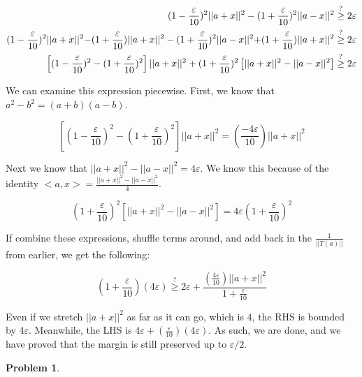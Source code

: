\documentclass[11pt]{article}
\theoremstyle{definition}
\theoremstyle{case}
\theoremstyle{theorem}
\newtheorem{prob}{Problem}
\begin{document}
\begin{enumerate}[label=(\alph*)]
\begin{align*}
  (1-\frac{\varepsilon}{10})^2||a+x||^2 - (1 + \frac{\varepsilon}{10})^2||a-x||^2 &\stackrel{?}{\geq} 2\varepsilon \\
  (1-\frac{\varepsilon}{10})^2||a+x||^2 \textbf{$ - (1 + \frac{\varepsilon}{10})||a+x||^2$} - (1 + \frac{\varepsilon}{10})^2||a-x||^2 \textbf{$ + (1 + \frac{\varepsilon}{10})||a+x||^2$} &\stackrel{?}{\geq} 2\varepsilon \\
  \left[ (1 - \frac{\varepsilon}{10})^2 - (1 + \frac{\varepsilon}{10})^2 \right]||a+x||^2 + (1 + \frac{\varepsilon}{10})^2\left[ ||a+x||^2 - ||a-x||^2 \right] &\stackrel{?}{\geq} 2\varepsilon
\end{align*}

We can examine this expression piecewise. First, we know that $a^2 - b^2 = (a + b)(a - b)$. 

\[
  \left[ (1 - \frac{\varepsilon}{10})^2 - (1 + \frac{\varepsilon}{10})^2 \right] ||a+x||^2 = (\frac{-4\varepsilon}{10})||a+x||^2 
\]

Next we know that $||a+x||^2 - ||a-x||^2 = 4\varepsilon$. We know this because of the identity $<a,x> = \frac{||a+x||^2 - ||a-x||^2}{4}$. 

\[
  (1 + \frac{\varepsilon}{10})^2\left[ ||a+x||^2 - ||a-x||^2 \right] = 4\varepsilon (1 + \frac{\varepsilon}{10})^2
\]

If combine these expressions, shuffle terms around, and add back in the $\frac{1}{||T(a)||}$ from earlier, we get the following:

\[
  (1 + \frac{\varepsilon}{10})(4\varepsilon) \stackrel{?}{\geq} 2\varepsilon + \frac{(\frac{4\varepsilon}{10})||a+x||^2}{1 + \frac{\varepsilon}{10}}
\]

Even if we stretch $||a+x||^2$ as far as it can go, which is $4$, the RHS is bounded by $4 \varepsilon$. Meanwhile, the LHS is
$4\varepsilon + (\frac{\varepsilon}{10})(4\varepsilon)$. As such, we are done, and we have proved that the margin is still preserved up to $\varepsilon / 2$.

\end{enumerate}

\newpage

\begin{prob}
\end{prob}
\end{document}

